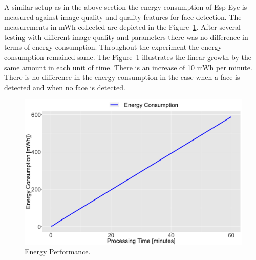 A similar setup as in the above section the energy consumption of Esp Eye is measured against image quality and quality features for face detection. The measurements in mWh collected are depicted in the Figure~\ref{fig:energy}. After several testing with different image quality and parameters there was no difference in terms of energy consumption. Throughout the experiment the energy consumption remained same. The Figure~\ref{fig:energy} illustrates the linear growth by the same amount in each unit of time. There is an increase of 10 mWh per minute. There is no difference in the energy consumption in the case when a face is detected and when no face is detected. 



\begin{figure}[!htb]
    \centering
    \includegraphics[width=1\textwidth]{figures/energy.png}
    \caption{Energy Performance.}
    \label{fig:energy}
\end{figure}